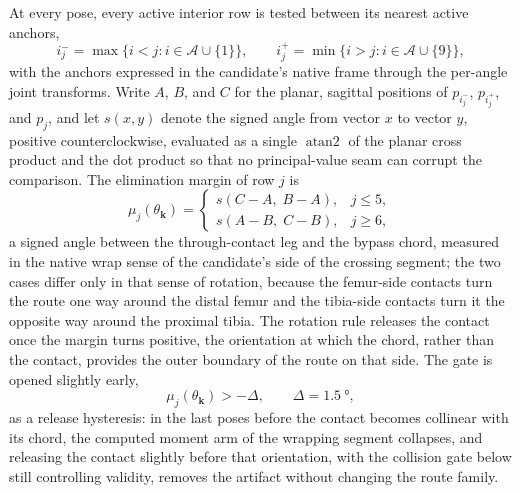 \documentclass[utf8]{frontiers_suppmat} %
\begin{document}
At every pose, every active interior row is tested between its nearest active anchors,
\begin{equation}
i^{-}_{j} = \max\{i < j : i \in \mathcal{A} \cup \{1\}\}, \qquad
i^{+}_{j} = \min\{i > j : i \in \mathcal{A} \cup \{9\}\},
\label{eq:app_anchors}
\end{equation}
with the anchors expressed in the candidate's native frame through the per-angle joint transforms. Write $A$, $B$, and $C$ for the planar, sagittal positions of $p_{i^{-}_{j}}$, $p_{i^{+}_{j}}$, and $p_{j}$, and let $s(x, y)$ denote the signed angle from vector $x$ to vector $y$, positive counterclockwise, evaluated as a single $\operatorname{atan2}$ of the planar cross product and the dot product so that no principal-value seam can corrupt the comparison. The elimination margin of row $j$ is
\begin{equation}
\mu_{j}(\theta_{\mathbf{k}}) =
\begin{cases}
s\!\left(C - A,\; B - A\right), & j \leq 5,\\[4pt]
s\!\left(A - B,\; C - B\right), & j \geq 6,
\end{cases}
\label{eq:app_elim_margin}
\end{equation}
a signed angle between the through-contact leg and the bypass chord, measured in the native wrap sense of the candidate's side of the crossing segment; the two cases differ only in that sense of rotation, because the femur-side contacts turn the route one way around the distal femur and the tibia-side contacts turn it the opposite way around the proximal tibia. The rotation rule releases the contact once the margin turns positive, the orientation at which the chord, rather than the contact, provides the outer boundary of the route on that side. The gate is opened slightly early,
\begin{equation}
\mu_{j}(\theta_{\mathbf{k}}) > -\Delta, \qquad \Delta = \qty{1.5}{\degree},
\label{eq:app_rotation_gate}
\end{equation}
as a release hysteresis: in the last poses before the contact becomes collinear with its chord, the computed moment arm of the wrapping segment collapses, and releasing the contact slightly before that orientation, with the collision gate below still controlling validity, removes the artifact without changing the route family.
\end{document}
